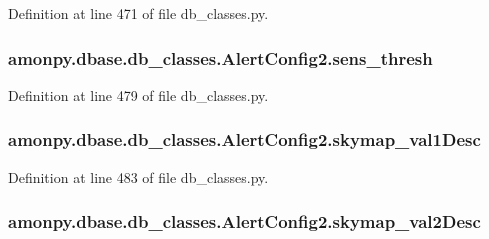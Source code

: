 Definition at line 471 of file db\-\_\-classes.\-py.

\hypertarget{classamonpy_1_1dbase_1_1db__classes_1_1_alert_config2_acf76b84f2e496115285d95ccf2d60c22}{
\subsubsection[{sens\-\_\-thresh}]{\setlength{\rightskip}{0pt plus 5cm}amonpy.\-dbase.\-db\-\_\-classes.\-Alert\-Config2.\-sens\-\_\-thresh}}\label{classamonpy_1_1dbase_1_1db__classes_1_1_alert_config2_acf76b84f2e496115285d95ccf2d60c22}


Definition at line 479 of file db\-\_\-classes.\-py.

\hypertarget{classamonpy_1_1dbase_1_1db__classes_1_1_alert_config2_a3f204082c6db7abec1c48e3599a5fe0b}{
\subsubsection[{skymap\-\_\-val1\-Desc}]{\setlength{\rightskip}{0pt plus 5cm}amonpy.\-dbase.\-db\-\_\-classes.\-Alert\-Config2.\-skymap\-\_\-val1\-Desc}}\label{classamonpy_1_1dbase_1_1db__classes_1_1_alert_config2_a3f204082c6db7abec1c48e3599a5fe0b}


Definition at line 483 of file db\-\_\-classes.\-py.

\hypertarget{classamonpy_1_1dbase_1_1db__classes_1_1_alert_config2_ab819dfd55a24c72966efc393ecb82261}{
\subsubsection[{skymap\-\_\-val2\-Desc}]{\setlength{\rightskip}{0pt plus 5cm}amonpy.\-dbase.\-db\-\_\-classes.\-Alert\-Config2.\-skymap\-\_\-val2\-Desc}}\label{classamonpy_1_1dbase_1_1db__classes_1_1_alert_config2_ab819dfd55a24c72966efc393ecb82261}


